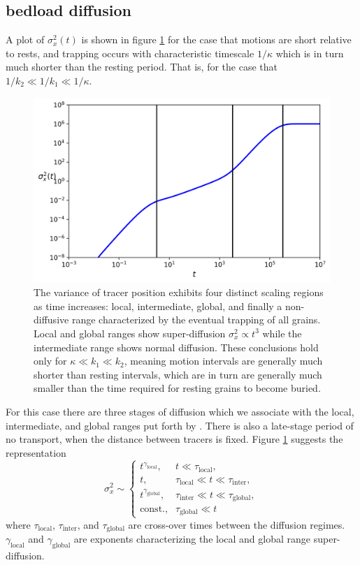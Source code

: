 \documentclass[]{agujournal2018}
\newcommand\be{\begin{equation}}
\newcommand\ee{\end{equation}}
\begin{document}
\subsection{bedload diffusion}
A plot of $\sigma_x^2(t)$ is shown in figure \ref{fig:var} for the case that motions are short relative to rests, and trapping occurs with characteristic timescale $1/\kappa$ which is in turn much shorter than the resting period.
That is, for the case that $1/k_2 \ll 1/k_1 \ll 1/\kappa$.
\begin{figure}[t]
	\includegraphics[width=\linewidth,keepaspectratio]{./figures/diffusion.png}
	\caption{The variance of tracer position exhibits four distinct scaling regions as time increases: local, intermediate, global, and finally a non-diffusive range characterized by the eventual trapping of all grains.
	Local and global ranges show super-diffusion $\sigma_x^2 \propto t^3$ while the intermediate range shows normal diffusion. These conclusions hold only for $\kappa \ll k_1 \ll k_2$, meaning motion intervals are generally much shorter than resting intervals, which are in turn are generally much smaller than the time required for resting grains to become buried.}
	\label{fig:var}
\end{figure}
For this case there are three stages of diffusion which we associate with the local, intermediate, and global ranges put forth by \citet{Nikora2001a}. There is also a late-stage period of no transport, when the distance between tracers is fixed.
Figure \ref{fig:var} suggests the representation
\be \sigma_x^2 \sim
\begin{cases}
t^{\gamma_\text{local}}, & t\ll \tau_\text{local},\\
t, & \tau_\text{local} \ll t \ll \tau_\text{inter}, \\
t^{\gamma_\text{global}}, & \tau_\text{inter} \ll t \ll \tau_\text{global}, \\
\text{const.}, & \tau_\text{global} \ll  t
\end{cases}\ee
where $\tau_\text{local}$, $\tau_\text{inter}$, and $\tau_\text{global}$ are cross-over times between the diffusion regimes.
$\gamma_\text{local}$ and $\gamma_\text{global}$ are exponents characterizing the local and global range super-diffusion.
\end{document}
